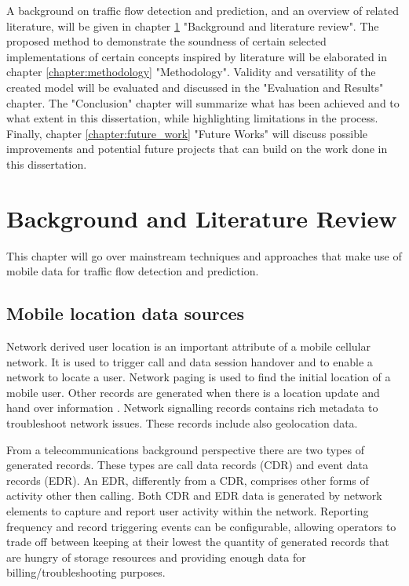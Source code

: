 \documentclass[12pt, a4paper]{report}
\theoremstyle{definition}
\theoremstyle{definition}%
\theoremstyle{definition}%
\theoremstyle{definition}%
\theoremstyle{definition}%
\theoremstyle{definition}%
\begin{document}
 A background on traffic flow detection and prediction, and an overview of related literature, will be given in chapter \ref{chapter:background} "Background and literature review". The proposed method to demonstrate the soundness of certain selected implementations of certain concepts inspired by literature will be elaborated in chapter \ref{chapter:methodology} "Methodology".  Validity and versatility of the created model will be evaluated and discussed in the "Evaluation and Results" chapter.  The "Conclusion" chapter will summarize what has been achieved and to what extent in this dissertation, while highlighting limitations in the process. Finally, chapter  \ref{chapter:future_work} "Future Works"  will discuss possible improvements and potential future projects that can build on the work done in this dissertation.



\chapter{Background and Literature Review} \label{chapter:background}

This chapter will go over mainstream techniques and approaches that make use of mobile data for traffic flow detection and prediction.

\section{Mobile location data sources} \label{background_mobile_location_data_sources} 

Network derived user location is an important attribute of a mobile cellular network. It is used to trigger call and data session handover and to enable a network to locate a user. Network paging is used to find the initial location of a mobile user. Other records are generated when there is a location update and hand over information \cite{Calabrese2011}. Network signalling records contains rich metadata to troubleshoot network issues. These records include also geolocation data. 

From a telecommunications background perspective there are two types of generated records.  These types are call data records (CDR) and event data records (EDR). An EDR, differently from a CDR, comprises other forms of activity other then calling. Both CDR and EDR data is generated by network elements to capture and report user activity within the network. Reporting frequency and record triggering events can be configurable, allowing operators to trade off between keeping at their lowest the quantity of generated records that are hungry of storage resources and providing enough data for billing/troubleshooting purposes.
\end{document}

